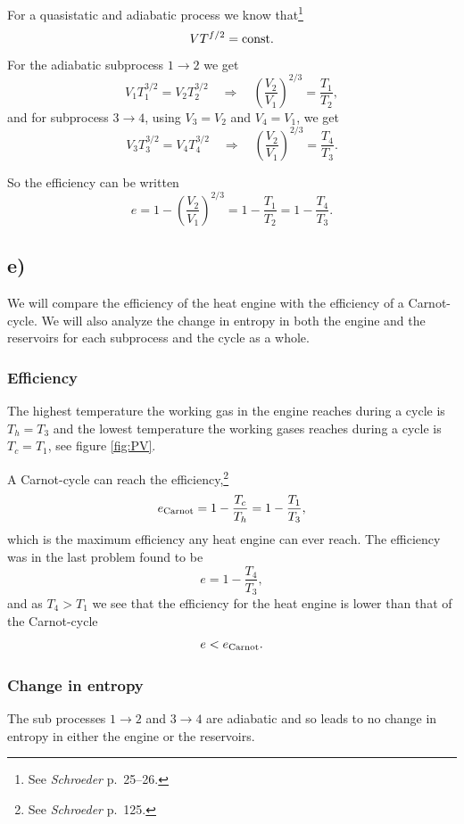 \documentclass[a4paper, 11pt, titlepage, english]{article}
\begin{document}
For a quasistatic and adiabatic process we know that\footnote{See {\it Schroeder } p.\ 25--26.}
$$ VT^{f/2} = {\rm const.} $$
For the adiabatic subprocess $1\rightarrow2$ we get
$$V_1T_1^{3/2} = V_2T_2^{3/2} \quad \Rightarrow \quad \left(\frac{V_2}{V_1}\right)^{2/3} = \frac{T_1}{T_2},$$
and for subprocess $3\rightarrow4$, using $V_3 = V_2$ and $V_4 = V_1$, we get
$$V_3T_3^{3/2} = V_4T_4^{3/2} \quad \Rightarrow \quad \left(\frac{V_2}{V_1}\right)^{2/3} = \frac{T_4}{T_3}.$$

So the efficiency can be written
$$e = 1 - \left(\frac{V_2}{V_1}\right)^{2/3} = 1 - \frac{T_1}{T_2} = 1 - \frac{T_4}{T_3}.$$

\subsection*{e)}
We will compare the efficiency of the heat engine with the efficiency of a Carnot-cycle. We will also analyze the change in entropy in both the engine and the reservoirs  for each subprocess and the cycle as a whole.

\subsubsection*{Efficiency}
The highest temperature the working gas in the engine reaches during a cycle is $T_h = T_3$ and the lowest temperature the working gases reaches during a cycle is $T_c = T_1$, see figure \ref{fig:PV}.

A Carnot-cycle can reach the efficiency,\footnote{See {\it Schroeder } p.\ 125.}
$$e_{\rm Carnot} = 1 - \frac{T_c}{T_h} = 1 - \frac{T_1}{T_3},$$
which is the maximum efficiency any heat engine can ever reach. The efficiency was in the last problem found to be
$$e = 1 - \frac{T_4}{T_3},$$
and as $T_4 > T_1$ we see that the efficiency for the heat engine is lower than that of the Carnot-cycle
$$e < e_{\rm Carnot}.$$

\subsubsection*{Change in entropy}
The sub processes $1\rightarrow2$ and $3\rightarrow4$ are adiabatic and so leads to no change in entropy in either the engine or the reservoirs.
\end{document}
